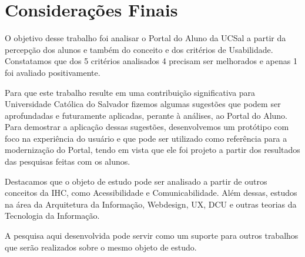 \documentclass[12pt]{article}
\begin{document}
\section{Considerações Finais\label{sec:consideracoes}}
O objetivo desse trabalho foi analisar o Portal do Aluno da UCSal a partir da percepção dos alunos e também do conceito e dos critérios de Usabilidade. Constatamos que dos 5 critérios analisados 4 precisam ser melhorados e apenas 1 foi avaliado positivamente. 

Para que este trabalho resulte em uma contribuição significativa para Universidade Católica do Salvador fizemos algumas sugestões que podem ser aprofundadas e futuramente aplicadas, perante à análises, ao Portal do Aluno. Para demostrar a aplicação dessas sugestões, desenvolvemos um protótipo com foco na experiência do usuário e que pode ser utilizado como referência para a modernização do Portal, tendo em vista que ele foi projeto a partir dos resultados das pesquisas feitas com os alunos.

Destacamos que o objeto de estudo pode ser analisado a partir de outros conceitos da IHC, como Acessibilidade e Comunicabilidade. Além dessas, estudos na área da Arquitetura da Informação, Webdesign, UX, DCU e outras teorias da Tecnologia da Informação. 

A pesquisa aqui desenvolvida pode servir como um suporte para outros trabalhos que serão realizados sobre o mesmo objeto de estudo. 



\end{document}
